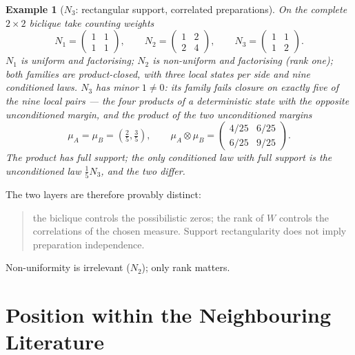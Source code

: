 \documentclass[11pt,a4paper]{article}
\newtheorem{example}[theorem]{Example}
\begin{document}
    \begin{example}[$N_3$: rectangular support, correlated preparations]
      \label{ex:n3}
      On the complete $2 \times 2$ biclique take counting weights
      \begin{equation}
        N_1 = \begin{pmatrix} 1 & 1 \\ 1 & 1 \end{pmatrix},
        \qquad
        N_2 = \begin{pmatrix} 1 & 2 \\ 2 & 4 \end{pmatrix},
        \qquad
        N_3 = \begin{pmatrix} 1 & 1 \\ 1 & 2 \end{pmatrix}.
      \end{equation}
      $N_1$ is uniform and factorising; $N_2$ is non-uniform and factorising (rank one); both families are
      product-closed, with three local states per side and nine conditioned laws.
      $N_3$ has minor $1 \neq 0$: its family fails closure on exactly five of the nine local pairs --- the
      four products of a deterministic state with the opposite unconditioned margin, and the product of the
      two unconditioned margins
      \begin{equation}
        \mu_A = \mu_B = \left( \tfrac{2}{5}, \tfrac{3}{5} \right),
        \qquad
        \mu_A \otimes \mu_B
        = \begin{pmatrix} 4/25 & 6/25 \\ 6/25 & 9/25 \end{pmatrix}.
      \end{equation}
      The product has full support; the only conditioned law with full support is the unconditioned law
      $\tfrac{1}{5} N_3$, and the two differ.
    \end{example}

    The two layers are therefore provably distinct:
    \begin{quote}
      the biclique controls the possibilistic zeros; the rank of $W$ controls the correlations of the
      chosen measure.
      Support rectangularity does not imply preparation independence.
    \end{quote}
    Non-uniformity is irrelevant ($N_2$); only rank matters.

  \section{Position within the Neighbouring Literature}
  \label{sec:position}
\end{document}
